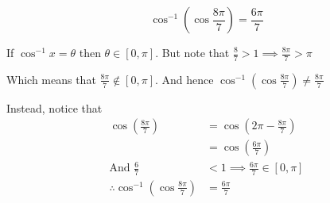 \documentclass[14pt,fleqn]{extarticle}
\newcommand\angb{\frac{8\pi}{7}}
\newcommand\prng{ \left[0,\pi \right]}
\newcommand\angc{\frac{6\pi}{7}}
\begin{document}
 
\begin{snippet}
    
    \correct
    
    \[ \cos^{-1} \left(\cos\frac{8\pi}{7} \right) = \frac{6\pi}{7} \]
    
    \reason
    
    If $\cos^{-1} x = \theta$ then $\theta \in \left[0,\pi \right]$. But note that $\frac{8}{7} > 1\implies\frac{8\pi}{7} > \pi$ \newline 
    
Which means that $\angb\notin\prng$. And hence $\cos^{-1}\left( \cos\angb\right)\neq\angb$ \newline 

Instead, notice that 
\begin{align}
\cos \left(\angb \right) &= \cos \left(2\pi-\angb \right) \\
&= \cos \left(\angc \right) \\
\text{And }\frac{6}{7} &< 1\implies \angc\in\prng \\
\therefore \cos^{-1}\left(\cos\angb \right) &= \angc
\end{align}
    
\end{snippet} 
\end{document}
